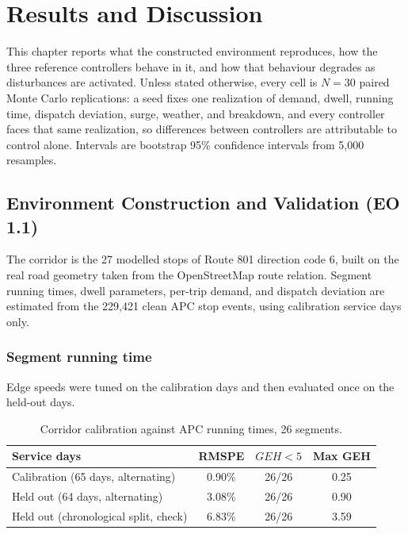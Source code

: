 \chapter{Results and Discussion}
\label{ch:results}


This chapter reports what the constructed environment reproduces, how the three reference controllers
behave in it, and how that behaviour degrades as disturbances are activated. Unless stated otherwise,
every cell is $N = 30$ paired Monte Carlo replications: a seed fixes one realization of demand, dwell,
running time, dispatch deviation, surge, weather, and breakdown, and every controller faces that same
realization, so differences between controllers are attributable to control alone. Intervals are
bootstrap 95\% confidence intervals from 5{,}000 resamples.

\section{Environment Construction and Validation (EO 1.1)}
\label{sec:results-eo11}

The corridor is the 27 modelled stops of Route 801 direction code 6, built on the real road geometry
taken from the OpenStreetMap route relation. Segment running times, dwell parameters, per-trip demand,
and dispatch deviation are estimated from the 229{,}421 clean APC stop events, using calibration
service days only.

\subsection{Segment running time}

Edge speeds were tuned on the calibration days and then evaluated once on the held-out days.

\begin{table}[htbp]
\centering
\caption[Corridor calibration]{Corridor calibration against APC running times, 26 segments.}
\label{tab:calibration}
\begin{tabular}{lccc}
\toprule
\textbf{Service days} & \textbf{RMSPE} & \textbf{$GEH < 5$} & \textbf{Max GEH} \\
\midrule
Calibration (65 days, alternating)     & 0.90\% & 26/26 & 0.25 \\
Held out (64 days, alternating)        & 3.08\% & 26/26 & 0.90 \\
Held out (chronological split, check)  & 6.83\% & 26/26 & 3.59 \\
\bottomrule
\end{tabular}
\end{table}

